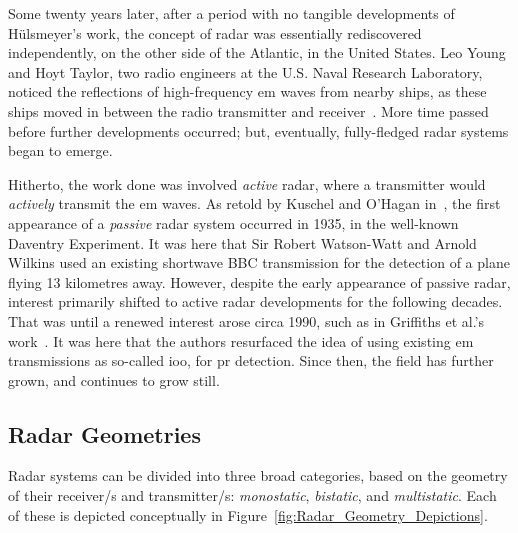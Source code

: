\documentclass[class=report,11pt,crop=false]{standalone}
\begin{document}
Some twenty years later, after a period with no tangible developments of H\"ulsmeyer's work, the concept of radar was essentially rediscovered independently, on the other side of the Atlantic, in the United States. Leo Young and Hoyt Taylor, two radio engineers at the U.S. Naval Research Laboratory, noticed the reflections of high-frequency \gls{em} waves from nearby ships, as these ships moved in between the radio transmitter and receiver~\cite{brown1999technical}. More time passed before further developments occurred; but, eventually, fully-fledged radar systems began to emerge.

Hitherto, the work done was involved \emph{active} radar, where a transmitter would \emph{actively} transmit the \gls{em} waves. As retold by Kuschel and O'Hagan in~\cite{kuschel-hagan-history}, the first appearance of a \emph{passive} radar system occurred in 1935, in the well-known Daventry Experiment. It was here that Sir Robert Watson-Watt and Arnold Wilkins used an existing shortwave BBC transmission for the detection of a plane flying 13 kilometres away. However, despite the early appearance of passive radar, interest primarily shifted to active radar developments for the following decades. That was until a renewed interest arose circa 1990, such as in Griffiths et al.'s work~\cite{Griffiths1992}. It was here that the authors resurfaced the idea of using existing \gls{em} transmissions as so-called \gls{ioo}, for \gls{pr} detection. Since then, the field has further grown, and continues to grow still.

\subsection{Radar Geometries}
Radar systems can be divided into three broad categories, based on the geometry of their receiver/s and transmitter/s: \emph{monostatic}, \emph{bistatic}, and \emph{multistatic}. Each of these is depicted conceptually in Figure~\ref{fig:Radar_Geometry_Depictions}.
\end{document}
